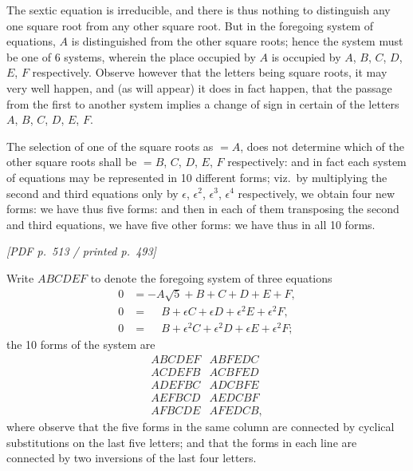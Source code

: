 \documentclass[11pt]{article}
\begin{document}
The sextic equation is irreducible, and there is thus nothing to distinguish any one square root from any other square root. But in the foregoing system of equations, $A$ is distinguished from the other square roots; hence the system must be one of 6 systems, wherein the place occupied by $A$ is occupied by $A$, $B$, $C$, $D$, $E$, $F$ respectively. Observe however that the letters being square roots, it may very well happen, and (as will appear) it does in fact happen, that the passage from the first to another system implies a change of sign in certain of the letters $A$, $B$, $C$, $D$, $E$, $F$.

The selection of one of the square roots as $= A$, does not determine which of the other square roots shall be $= B$, $C$, $D$, $E$, $F$ respectively: and in fact each system of equations may be represented in 10 different forms; viz.\ by multiplying the second and third equations only by $\epsilon$, $\epsilon^{2}$, $\epsilon^{3}$, $\epsilon^{4}$ respectively, we obtain four new forms: we have thus five forms: and then in each of them transposing the second and third equations, we have five other forms: we have thus in all 10 forms.

\vfill
\noindent\textit{[PDF p.~513 / printed p.~493]}
\newpage

\noindent Write $ABCDEF$ to denote the foregoing system of three equations
\begin{align*}
0 &= -A\sqrt{5} + B + C + D + E + F, \\
0 &= \phantom{-}B + \epsilon C + \epsilon D + \epsilon^{2}E + \epsilon^{2}F, \\
0 &= \phantom{-}B + \epsilon^{2}C + \epsilon^{2}D + \epsilon E + \epsilon^{2}F;
\end{align*}
the 10 forms of the system are
\[
\begin{array}{l|l}
ABCDEF & ABFEDC \\
ACDEFB & ACBFED \\
ADEFBC & ADCBFE \\
AEFBCD & AEDCBF \\
AFBCDE & AFEDCB,
\end{array}
\]
where observe that the five forms in the same column are connected by cyclical substitutions on the last five letters; and that the forms in each line are connected by two inversions of the last four letters.
\end{document}
